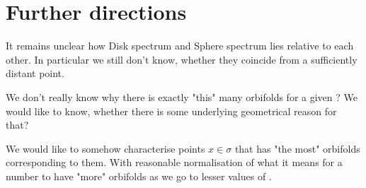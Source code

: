 
\section{Further directions}
It remains unclear how Disk spectrum and Sphere spectrum lies relative to each other. 
In particular we still don't know, whether they coincide from a sufficiently distant point.

We don't really know why there is exactly "this" many orbifolds for a given \Eoc? 
We would like to know, whether there is some underlying geometrical reason for that?

We would like to somehow characterise points $x \in \sigma$ that has "the most" 
orbifolds corresponding to them. With reasonable normalisation of what it means for a number
to have "more" orbifolds as we go to lesser values of \Eoc. 


